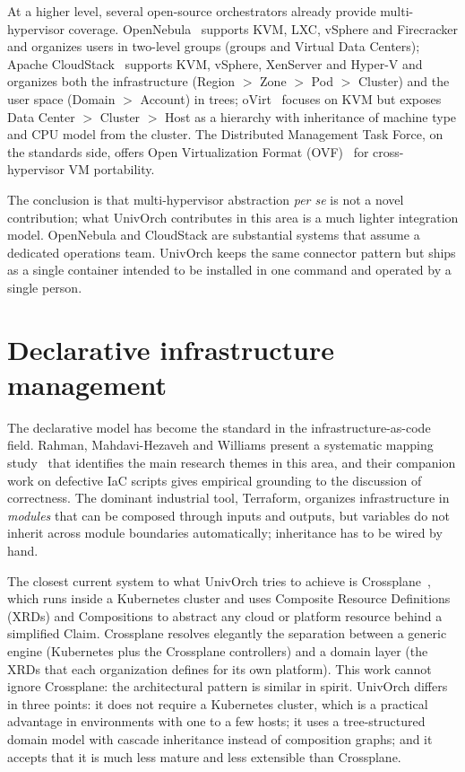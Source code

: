 At a higher level, several open-source orchestrators already provide
multi-hypervisor coverage. OpenNebula~\cite{opennebula-docs} supports
KVM, LXC, vSphere and Firecracker and organizes users in two-level
groups (groups and Virtual Data Centers); Apache
CloudStack~\cite{cloudstack-docs} supports KVM, vSphere, XenServer
and Hyper-V and organizes both the infrastructure (Region $>$ Zone
$>$ Pod $>$ Cluster) and the user space (Domain $>$ Account) in
trees; oVirt~\cite{ovirt-docs} focuses on KVM but exposes Data
Center $>$ Cluster $>$ Host as a hierarchy with inheritance of
machine type and CPU model from the cluster. The Distributed
Management Task Force, on the standards side, offers Open
Virtualization Format (OVF)~\cite{dmtf-ovf} for cross-hypervisor VM
portability.

The conclusion is that multi-hypervisor abstraction \emph{per se} is
not a novel contribution; what UnivOrch contributes in this area is a
much lighter integration model. OpenNebula and CloudStack are
substantial systems that assume a dedicated operations team. UnivOrch
keeps the same connector pattern but ships as a single container
intended to be installed in one command and operated by a single
person.

\section{Declarative infrastructure management}
\label{sec:declarative}

The declarative model has become the standard in the
infrastructure-as-code field. Rahman, Mahdavi-Hezaveh and Williams
present a systematic mapping study~\cite{rahman2019mapping} that
identifies the main research themes in this area, and their companion
work on defective IaC scripts gives
empirical grounding to the discussion of correctness. The dominant
industrial tool, Terraform, organizes infrastructure in
\emph{modules} that can be composed through inputs and outputs, but
variables do not inherit across module boundaries automatically;
inheritance has to be wired by hand.

The closest current system to what UnivOrch tries to achieve is
Crossplane~\cite{crossplane-docs}, which runs inside a Kubernetes
cluster and uses Composite Resource Definitions (XRDs) and
Compositions to abstract any cloud or platform resource behind a
simplified Claim. Crossplane resolves elegantly the separation
between a generic engine (Kubernetes plus the Crossplane controllers)
and a domain layer (the XRDs that each organization defines for its
own platform). This work cannot ignore Crossplane: the architectural
pattern is similar in spirit. UnivOrch differs in three points: it
does not require a Kubernetes cluster, which is a practical advantage
in environments with one to a few hosts; it uses a tree-structured
domain model with cascade inheritance instead of composition graphs;
and it accepts that it is much less mature and less extensible than
Crossplane.

